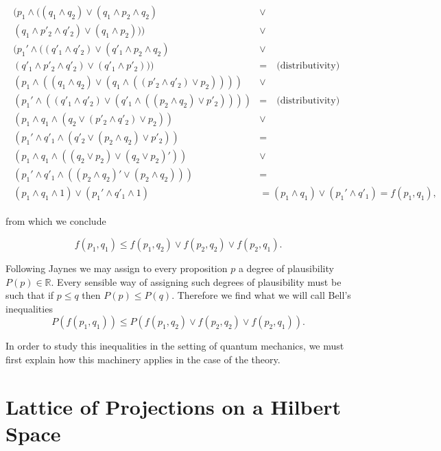 \begin{align}
\begin{split}
(p_1\wedge((q_1 \wedge q_2)\vee( q_1\wedge  p_2\wedge q_2)&\vee \\
(q_1\wedge  p'_2 \wedge q'_2)\vee ( q_1\wedge  p_2))) & \vee\\
(p_1'\wedge((q'_1 \wedge q'_2)\vee (q'_1\wedge  p_2\wedge q_2)&\vee \\
(q'_1\wedge  p'_2 \wedge q'_2)\vee (q'_1\wedge  p'_2 ))) &= \quad\text{(distributivity)}\\
(p_1\wedge((q_1 \wedge q_2)\vee (q_1\wedge(( p'_2 \wedge q'_2)\vee p_2))))&\vee \\
(p_1'\wedge((q'_1 \wedge q'_2)\vee (q'_1\wedge ((p_2\wedge q_2)\vee p'_2) )))&= \quad\text{(distributivity)}\\
(p_1\wedge q_1\wedge (q_2\vee ( p'_2 \wedge q'_2)\vee p_2))&\vee \\
(p_1'\wedge q'_1 \wedge (q'_2 \vee (p_2\wedge q_2) \vee p'_2) )&= \\ 
(p_1\wedge q_1\wedge ((q_2 \vee p_2) \vee (q_2 \vee p_2)'))&\vee \\
(p_1'\wedge q'_1 \wedge ((p_2\wedge q_2)'\vee (p_2\wedge q_2)) )&= \\
(p_1\wedge q_1\wedge 1)\vee (p_1'\wedge q'_1 \wedge 1)&= (p_1\wedge q_1)\vee (p_1'\wedge q'_1)=f(p_1,q_1),
\end{split}
\end{align}
 
    
from which we conclude 

\begin{equation}
f(p_1,q_1)\leq f(p_1,q_2)\vee f(p_2,q_2)\vee f(p_2,q_1). 
\end{equation}

Following Jaynes \cite{Jaynes2003} we may assign to every proposition $p$ a degree of plausibility $P(p)\in\mathbb{R}$. Every sensible way of assigning such degrees of plausibility must be such that if $p\leq q$ then $P(p)\leq P(q)$. Therefore we find what we will call Bell's inequalities
\begin{equation}
P(f(p_1,q_1))\leq P(f(p_1,q_2)\vee f(p_2,q_2)\vee f(p_2,q_1)). 
\end{equation}

In order to study this inequalities in the setting of quantum mechanics, we must first explain how this machinery applies in the case of the theory.

\section{Lattice of Projections on a Hilbert Space}\label{sec:Q_logic}

